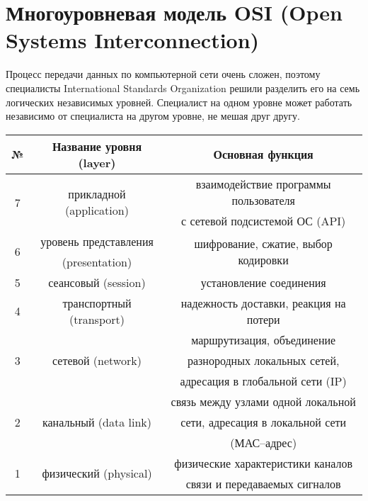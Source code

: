 \section{Многоуровневая модель OSI (Open Systems Interconnection)}
Процесс передачи данных по компьютерной сети очень сложен, поэтому специалисты International Standards Organization решили разделить его на семь логических независимых уровней. Специалист на одном уровне может работать независимо от специалиста на другом уровне, не мешая друг другу.
\begin{table}[!h]
\begin{tabular}{|c|c|c|}
\hline
№ & Название уровня (layer) & Основная функция \\
\hline
\multirow{2}{*}{7} & \multirow{2}{*}{прикладной (application)} & взаимодействие программы пользователя \\
& & с сетевой подсистемой ОС (API) \\
\hline
\multirow{2}{*}{6} & уровень представления & \multirow{2}{*}{шифрование, сжатие, выбор кодировки}\\
 & (presentation) & \\
\hline
5 & сеансовый (session)  & установление соединения\\
\hline
4 & транспортный (transport)  & надежность доставки, реакция на потери\\
\hline
\multirow{3}{*}{3} & \multirow{3}{*}{сетевой (network)} & маршрутизация, объединение  \\
& & разнородных локальных сетей, \\
& & адресация в глобальной сети (IP) \\
\hline
\multirow{3}{*}{2} & \multirow{3}{*}{канальный (data link)} & связь между узлами одной локальной \\
& & сети, адресация в локальной сети \\
& & (МАС--адрес)\\
\hline
\multirow{2}{*}{1} & \multirow{2}{*}{физический (physical)} & физические характеристики каналов  \\
& & связи и передаваемых сигналов \\
\hline
\end{tabular}
\end{table}

